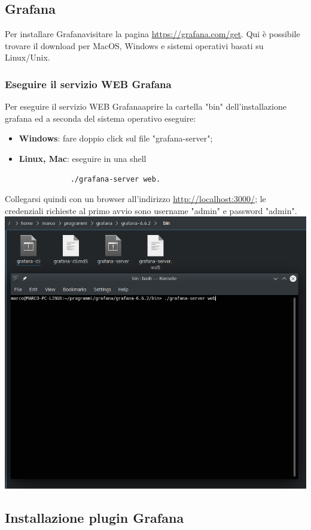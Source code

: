 \subsection{Grafana}
Per installare Grafana\glosp visitare la pagina \url{https://grafana.com/get}. Qui è possibile trovare il download per MacOS, Windows e sistemi operativi basati su Linux/Unix.
\subsubsection{Eseguire il servizio WEB Grafana} Per eseguire il servizio WEB Grafana\glosp aprire la cartella "bin" dell'installazione grafana ed a seconda del sistema operativo eseguire:
\begin{itemize}
	\item \textbf{Windows}: fare doppio click sul file "grafana-server";
	\item \textbf{Linux, Mac}: eseguire in una shell 
		\begin{verbatim}
			./grafana-server web.
		\end{verbatim}
\end{itemize}
Collegarsi quindi con un browser all'indirizzo \url{http://localhost:3000/}; le credenziali richieste al primo avvio sono username "admin" e password "admin".
\\
\includegraphics[width=\textwidth,height=\textheight,keepaspectratio]{img/grafana-server.png}

\subsection{Installazione plugin Grafana}
